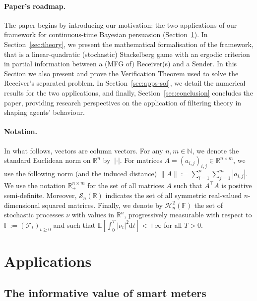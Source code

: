 \documentclass[a4paper,10pt]{article}
\newcommand{\NN}{\mathbb{N}}
\newcommand{\RR}{\mathbb{R}}
\newcommand{\D}{\mathrm{d}}
\theoremstyle{definition}
\theoremstyle{plain}
\numberwithin{equation}{section}
\begin{document}
\paragraph{Paper's roadmap.} 
The paper begins by introducing our motivation: the two applications of our framework for continuous-time Bayesian persuasion (Section~\ref{sec:apps}).  In Section~\ref{sec:theory}, we present the mathematical formalisation of the framework, that is a linear-quadratic (stochastic) Stackelberg game with an ergodic criterion in partial information between a (MFG of) Receiver(s) and a Sender. In this Section we also present and prove the Verification Theorem used to solve the Receiver's separated problem. In Section~\ref{sec:apps-sol}, we detail the numerical results for the two applications, and finally, Section~\ref{sec:conclusion} concludes the paper, providing research perspectives on the application of filtering theory in shaping agents' behaviour.


\paragraph{Notation.}
In what follows, vectors are column vectors.
For any $n,m \in \NN$, we denote the standard Euclidean norm on $\RR^n$ by $\
|\cdot|$. For matrices $A = (a_{i,j})_{i,j}\in \mathbb{R}^{n\times m}$, we use the following norm (and the induced distance)
$\| A\| := \sum_{i=1}^n \sum_{j=1}^m |a_{i,j}|$.
We use the notation $\mathbb R_+^{n \times m}$ for the set of all matrices $A$ such that $A^\top A$ is positive semi-definite. Moreover, $\mathcal S_n (\mathbb R)$ indicates the set of all symmetric real-valued $n$-dimensional squared matrices.
Finally, we denote by $\mathcal H_n ^2(\mathbb F)$ the set of stochastic processes $\nu$ with values in $\mathbb R^n$, progressively measurable with respect to $\mathbb F := {(\mathcal F_t)}_{t \ge 0}$ and such that $\mathbb E [ \int_0^T {|\nu_t|}^2 \D t ] < +\infty$ for all $T > 0$.


\section{Applications} \label{sec:apps}

\subsection{The informative value of smart meters}\label{sec:ex_elec}
\end{document}
